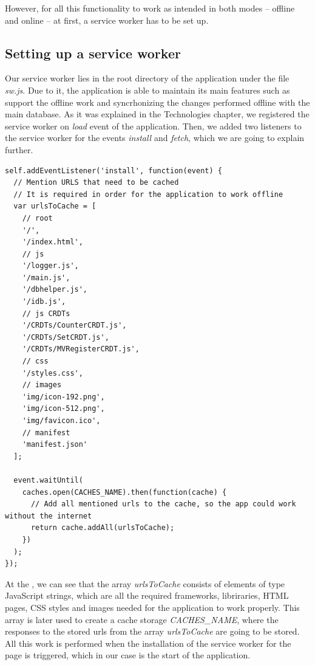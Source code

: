 However, for all this functionality to work as intended in both modes -- offline and online -- at first, a service worker has to be set up. 

\subsection*{Setting up a service worker}

Our service worker lies in the root directory of the application under the file \textit{sw.js}. Due to it, the application is able to maintain its main features such as support the offline work and syncrhonizing the changes performed offline with the main database. As it was explained in the Technologies chapter, we registered the service worker on \textit{load} event of the application. Then, we added two listeners to the service worker for the events \textit{install} and \textit{fetch}, which we are going to explain further.

\begin{lstlisting}[caption={Code for caching neccessary data for the client.}, label={lst:dev4}]
self.addEventListener('install', function(event) {
  // Mention URLS that need to be cached
  // It is required in order for the application to work offline
  var urlsToCache = [
    // root
    '/',
    '/index.html',
    // js
    '/logger.js',
    '/main.js',
    '/dbhelper.js',
    '/idb.js',
    // js CRDTs
    '/CRDTs/CounterCRDT.js',
    '/CRDTs/SetCRDT.js',
    '/CRDTs/MVRegisterCRDT.js',
    // css
    '/styles.css',
    // images
    'img/icon-192.png',
    'img/icon-512.png',
    'img/favicon.ico',
    // manifest
    'manifest.json'
  ];

  event.waitUntil(
    caches.open(CACHES_NAME).then(function(cache) {
      // Add all mentioned urls to the cache, so the app could work without the internet
      return cache.addAll(urlsToCache);
    })
  );
});
\end{lstlisting}

At the , we can see that the array \textit{urlsToCache} consists of elements of type JavaScript strings, which are all the required frameworks, libriraries, HTML pages, CSS styles and images needed for the application to work properly. This array is later used to create a cache storage \textit{CACHES\_NAME}, where the responses to the stored urls from the array \textit{urlsToCache} are going to be stored. All this work is performed when the installation of the service worker for the page is triggered, which in our case is the start of the application. 

